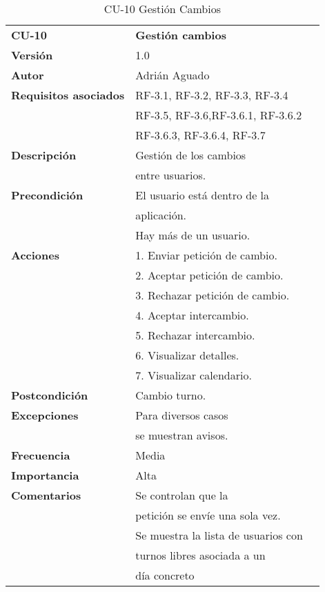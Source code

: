 \begin{table}[H]
\begin{tabular}{llr}  
\toprule
\begin{minipage}[b]{0.24\columnwidth}\raggedright\strut
\textbf{CU-10}\strut
\end{minipage} & \begin{minipage}[b]{0.72\columnwidth}\raggedright\strut
\textbf{Gestión cambios}\strut
\end{minipage}\tabularnewline
\cmidrule(r){1-2}
\textbf{Versión}       & 1.0           \\
\textbf{Autor}       & Adrián  Aguado    \\
\textbf{Requisitos asociados}       & RF-3.1, RF-3.2, RF-3.3, RF-3.4  \\ 
& RF-3.5, RF-3.6,RF-3.6.1, RF-3.6.2 \\ 
& RF-3.6.3, RF-3.6.4,  RF-3.7 \\ 
\textbf{Descripción} & Gestión de los cambios \\
& entre usuarios. \\
\textbf{Precondición}  & El usuario está dentro de la \\
& aplicación.      \\
& Hay más de un usuario. \\
\textbf{Acciones} & 1. Enviar petición de cambio. \\
& 2. Aceptar petición de cambio. \\
& 3. Rechazar petición de cambio. \\
& 4. Aceptar intercambio. \\
& 5. Rechazar intercambio.  \\
& 6. Visualizar detalles.  \\
& 7. Visualizar calendario. \\
\textbf{Postcondición} & Cambio turno. \\
\textbf{Excepciones} &   Para diversos casos  \\
 &   se muestran avisos.  \\
\textbf{Frecuencia} & Media          \\
\textbf{Importancia} & Alta            \\
\textbf{Comentarios } & Se controlan que la       \\
& petición se envíe una sola vez. \\
& Se muestra la lista de usuarios con \\
& turnos libres asociada a un \\
& día concreto \\
\bottomrule
\end{tabular}
\caption{CU-10 Gestión Cambios} 
\end{table}

